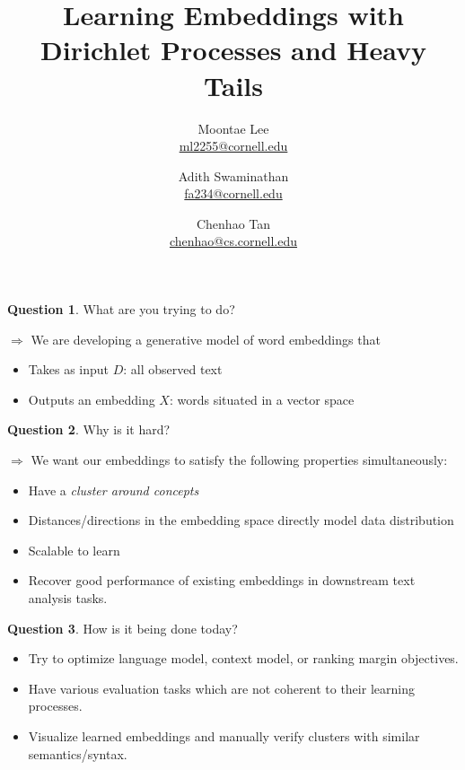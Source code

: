 \documentclass[11pt]{article}
\title{Learning Embeddings with Dirichlet Processes and Heavy Tails}
\author{%
  Moontae Lee \\ \href{ml2255@cornell.edu}{ml2255@cornell.edu}
  \and Adith Swaminathan\\ \href{fa234@cornell.edu}{fa234@cornell.edu}
  \and Chenhao Tan\\ \href{chenhao@cs.cornell.edu}{chenhao@cs.cornell.edu} 
}
\theoremstyle{plain} \numberwithin{equation}{section}
\theoremstyle{definition}
\newtheorem{question}{Question}
\begin{document}
\maketitle


\begin{question}{What are you trying to do?}\end{question}
\vspace{-10px}
$\Rightarrow$ We are developing a generative model of word embeddings that
\begin{itemize}
  \vspace{-10px}
  \setlength\itemsep{1px}
  \setlength{\itemindent}{0.4in}
  \item Takes as input $D$: all observed text
  \item Outputs an embedding $X$: words situated in a vector space
\end{itemize}
\vspace{3px}


\begin{question}{Why is it hard?}\end{question}
\vspace{-10px}
$\Rightarrow$ We want our embeddings to satisfy the following properties simultaneously:
\begin{itemize}
  \vspace{-10px}
  \setlength\itemsep{1px}
  \setlength{\itemindent}{0.4in}
  \item Have a \emph{cluster around concepts}
  \item Distances/directions in the embedding space directly model data distribution
  \item Scalable to learn
  \item Recover good performance of existing embeddings in downstream text analysis tasks.
\end{itemize}
\vspace{3px}


\begin{question}{How is it being done today?}\end{question}
\vspace{-10px}
\begin{itemize}
  \vspace{-10px}
  \setlength\itemsep{1px}
  \setlength{\itemindent}{0.4in}
  \item Try to optimize language model, context model, or ranking margin objectives.
  \item Have various evaluation tasks which are not coherent to their learning processes.
  \item Visualize learned embeddings and manually verify clusters with similar semantics/syntax.
\end{itemize}
\vspace{3px}
\end{document}
